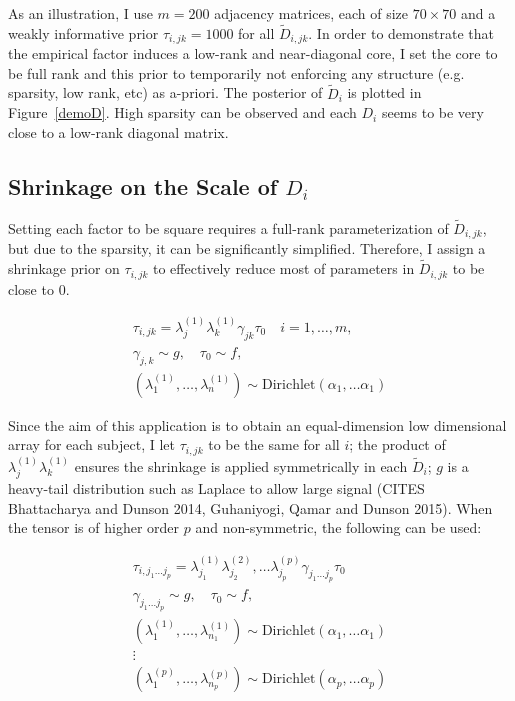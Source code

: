 \documentclass[10pt]{article}
\newcommand{\be}{\begin{equation}\begin{aligned}}
\newcommand{\ee}{\end{aligned}\end{equation}}
\begin{document}
As an illustration, I use $m=200$ adjacency matrices, each of size $70 \times 70$ and a weakly informative prior $\tau_{i,jk}=1000$ for all $\tilde D_{i,jk}$. In order to demonstrate that the empirical factor induces a low-rank and near-diagonal core, I set the core to be full rank and this prior to temporarily not enforcing any structure (e.g. sparsity, low rank, etc) as a-priori. The posterior of $\tilde D_i$ is plotted in Figure~\ref{demoD}. High sparsity can be observed and each $D_i$ seems to be very close to a low-rank diagonal matrix.

\subsection{Shrinkage on the Scale of $D_i$}

Setting each factor to be square requires a full-rank parameterization of $\tilde D_{i,jk}$, but due to the sparsity, it can be significantly simplified. Therefore, I assign a shrinkage prior on $\tau_{i,jk}$ to effectively reduce most of parameters in $\tilde D_{i,jk}$ to be close to $0$.

\be
\tau_{i,jk}= \lambda^{(1)}_j \lambda^{(1)}_k \gamma_{jk}\tau_0 \quad i=1,\ldots,m,\\
\gamma_{j,k} \sim g, \quad \tau_0 \sim f,\\
(\lambda^{(1)}_1,\ldots, \lambda^{(1)}_n) \sim \text{Dirichlet} (\alpha_1, \ldots \alpha_1)
\ee

Since the aim of this application is to obtain an equal-dimension low dimensional array for each subject, I let $\tau_{i,jk}$ to be the same for all $i$; the product of $\lambda^{(1)}_j \lambda^{(1)}_k$ ensures the shrinkage is applied symmetrically in each $\tilde D_i$; $g$ is a heavy-tail distribution such as Laplace to allow large signal (CITES Bhattacharya and Dunson 2014, Guhaniyogi, Qamar and Dunson 2015). When the tensor is of higher order $p$ and non-symmetric, the following can be used:

\be
\tau_{i,j_1\ldots j_p}= \lambda^{(1)}_{j_1} \lambda^{(2)}_{j_2}, \ldots \lambda^{(p)}_{j_p}\gamma_{j_1\ldots j_p} \tau_0\\
\gamma_{j_1\ldots j_p} \sim g, \quad \tau_0 \sim f,\\
(\lambda^{(1)}_1,\ldots, \lambda^{(1)}_{n_1}) \sim \text{Dirichlet} (\alpha_1, \ldots \alpha_1)\\
\vdots\\
(\lambda^{(p)}_1,\ldots, \lambda^{(p)}_{n_p}) \sim \text{Dirichlet} (\alpha_p, \ldots \alpha_p)
\ee
\end{document}
